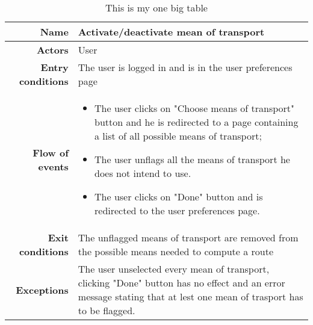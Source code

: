 \begin{table}
\begin{tabular}{r|p{7cm}}
\bf\large Name&\bf\large Activate/deactivate mean of transport\\
\hline
\hline
\bf Actors&User\\
\hline
\bf Entry conditions&The user is logged in and is in the user preferences page\\
\hline
\bf Flow of events&
\begin{itemize}
\item The user clicks on "Choose means of transport" button and he is redirected to a page containing a list of all possible means of transport;
\item  The user unflags all the means of transport he does not intend to use.
\item  The user clicks on "Done" button and is redirected to the user preferences page.
\end{itemize}
\\
\hline
\bf Exit conditions&The unflagged means of transport are removed from the possible means needed to compute a route\\
\hline
\bf Exceptions&The user unselected every mean of transport, clicking "Done" button has no effect and an error message stating that at lest one mean of trasport has to be flagged.
\\
\hline

\end{tabular}
\caption{This is my one big table} \label{tab:activatedeactivatemean}
\end{table}